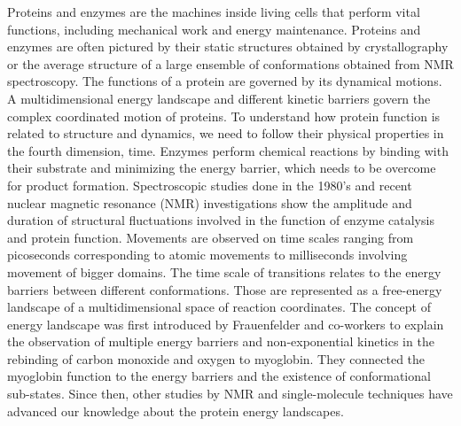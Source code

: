 Proteins and enzymes are the machines inside living cells that perform vital functions, including mechanical work and energy maintenance.
Proteins and enzymes are often pictured by their static structures obtained by crystallography or the average structure of a large ensemble of conformations obtained from NMR spectroscopy.
The functions of a protein are governed by its dynamical motions.
A multidimensional energy landscape and different kinetic barriers govern the complex coordinated motion of proteins.
To understand how protein function is related to structure and dynamics, we need to follow their physical properties in the fourth dimension, time.
Enzymes perform chemical reactions by binding with their substrate and minimizing the energy barrier, which needs to be overcome for product formation.
Spectroscopic studies done in the 1980's and recent nuclear magnetic resonance (NMR) investigations show the amplitude and duration of structural fluctuations involved in the function of enzyme catalysis and protein function.
Movements are observed on time scales ranging from picoseconds corresponding to atomic movements to milliseconds involving movement of bigger domains.\cite{henzler-wildman2007dynamic,frauenfelder1991the}
The time scale of transitions relates to the energy barriers between different conformations. Those are represented as a free-energy landscape of a multidimensional space of reaction coordinates.
The concept of energy landscape was first introduced by Frauenfelder and co-workers\cite{frauenfelder1991the} to explain the observation of multiple energy barriers and non-exponential kinetics in the rebinding of carbon monoxide and oxygen to myoglobin.
They connected the myoglobin function to the energy barriers and the existence of conformational sub-states.
Since then, other studies by NMR and single-molecule techniques have advanced our knowledge about the protein energy landscapes.

